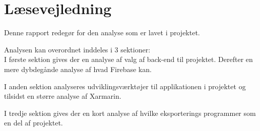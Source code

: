 \chapter*{Læsevejledning}
Denne rapport redegør for den analyse som er lavet i projektet. 

Analysen kan overordnet inddeles i 3 sektioner:\\
I første sektion gives der en analyse af valg af back-end til projektet. Derefter en mere dybdegånde analyse af hvad Firebase kan.

I anden sektion analyseres udviklingsværktøjer til applikationen i projektet og tilsidst en større analyse af Xarmarin.

I tredje sektion gives der en kort analyse af hvilke eksporterings programmer som en del af projektet.


